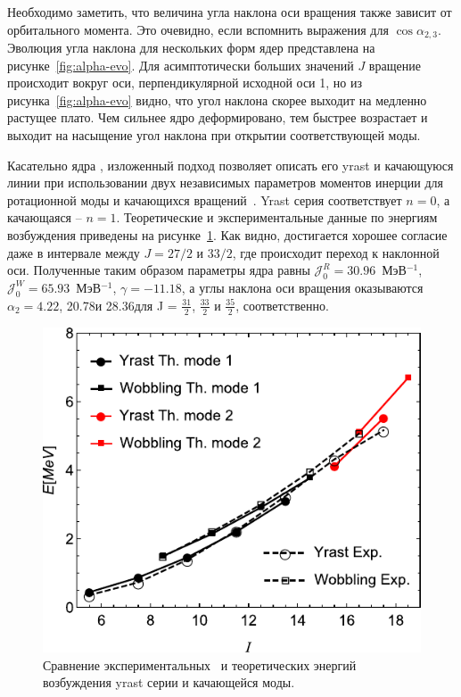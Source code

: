 \documentclass[a4paper, 10pt, twocolumn]{article}
\begin{document}
Необходимо заметить, что величина угла наклона оси вращения также 
зависит от орбитального момента. Это очевидно, если вспомнить выражения 
для $\cos\alpha_{2,3}$. Эволюция угла наклона для нескольких форм ядер 
представлена на рисунке~\ref{fig:alpha-evo}. Для асимптотически больших 
значений $J$ вращение происходит вокруг оси, перпендикулярной исходной 
оси 1, но из рисунка~\ref{fig:alpha-evo} видно, что угол наклона скорее 
выходит на медленно растущее плато. Чем сильнее ядро деформировано, тем 
быстрее возрастает и выходит на насыщение угол наклона при открытии 
соответствующей моды.

Касательно ядра \Pr{}, изложенный подход позволяет описать его yrast 
и качающуюся линии при использовании двух независимых параметров 
моментов инерции для ротационной моды и качающихся 
вращений~\cite{tilted-wobb}. Yrast серия соответствует $n=0$, 
а качающаяся -- $n=1$. Теоретические и экспериментальные данные по 
энергиям возбуждения приведены на рисунке~\ref{fig:th-exp}. Как видно, 
достигается хорошее согласие даже в интервале между $J = 27/2$ и $33/2$, 
где происходит переход к наклонной оси. Полученные таким образом 
параметры ядра равны
$\mathcal{J}^R_0 = 30.96$~МэВ$^{-1}$,
$\mathcal{J}^W_0 = 65.93$~МэВ$^{-1}$,
$\gamma = - 11.18$\textdegree,
а углы наклона оси вращения оказываются $\alpha_2=4.22$\textdegree, 
20.78\textdegree и 28.36\textdegree для J = $\tfrac{31}{2}$, 
$\tfrac{33}{2}$ и $\tfrac{35}{2}$, соответственно.

\begin{figure}%
	\centering
	\includegraphics[width=\linewidth]{figures/yrast-wobb-th-exp}
	\caption{Сравнение экспериментальных~\cite{Pr2} и теоретических 
	энергий возбуждения yrast серии и качающейся моды.}
	\label{fig:th-exp}
\end{figure}%
\end{document}
